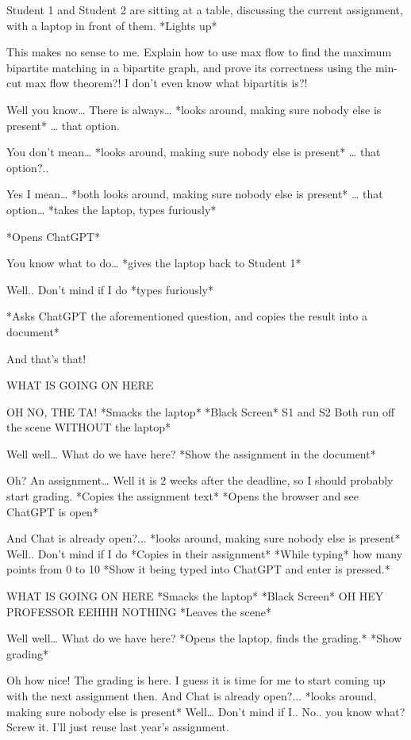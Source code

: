 \documentclass{article}
\begin{document}
\newpage%
\begin{sketch}
\scene Student 1 and Student 2 are sitting at a table, discussing the current assignment, with a laptop in front of them. *Lights up*

This makes no sense to me. Explain how to use max flow to find the maximum bipartite matching in a bipartite graph, and prove its correctness using the min-cut max flow theorem?! I don’t even know what bipartitis is?!

Well you know… There is always… *looks around, making sure nobody else is present* … that option.

You don’t mean… *looks around, making sure nobody else is present* … that option?..

Yes I mean… *both looks around, making sure nobody else is present* … that option… *takes the laptop, types furiously*

 *Opens ChatGPT*

You know what to do… *gives the laptop back to Student 1*

Well.. Don’t mind if I do *types furiously*

 *Asks ChatGPT the aforementioned question, and copies the result into a document*

And that’s that!

 WHAT IS GOING ON HERE

OH NO, THE TA!
 *Smacks the laptop*
 *Black Screen*
\scene *S1 and S2 Both run off the scene WITHOUT the laptop*

Well well… What do we have here?
 *Show the assignment in the document*

Oh? An assignment… Well it is 2 weeks after the deadline, so I should probably start grading.
 *Copies the assignment text*
 *Opens the browser and see ChatGPT is open*

And Chat is already open?... *looks around, making sure nobody else is present* Well.. Don’t mind if I do *Copies in their assignment*
*While typing* how many points from 0 to 10
 *Show it being typed into ChatGPT and enter is pressed.*

WHAT IS GOING ON HERE
 *Smacks the laptop*
 *Black Screen*
OH HEY PROFESSOR EEHHH NOTHING
 *Leaves the scene*

Well well… What do we have here?
*Opens the laptop, finds the grading.*
 *Show grading*

Oh how nice! The grading is here. I guess it is time for me to start coming up with the next assignment then.
And Chat is already open?...
*looks around, making sure nobody else is present*
Well… Don’t mind if I.. 
No.. you know what? Screw it. I’ll just reuse last year’s assignment.

\end{sketch}
\end{document}
